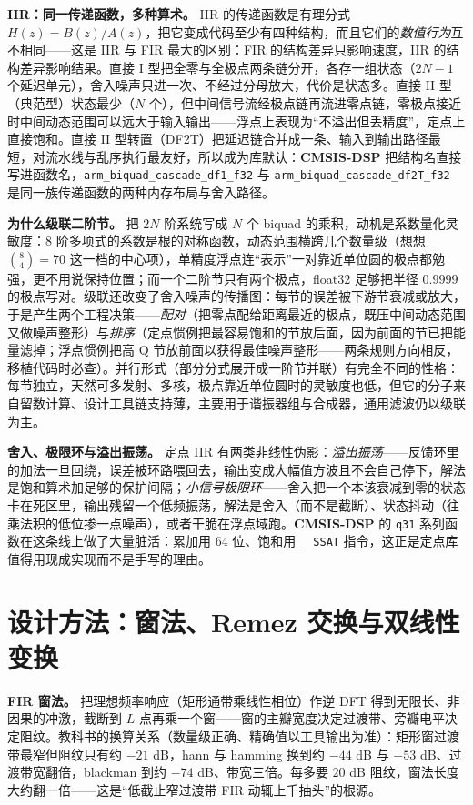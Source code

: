 \documentclass[12pt,a4paper,fontset=fandol]{ctexbook}
\newcommand{\Tp}[1]{\texttt{#1}}
\newcommand{\Bk}{\allowbreak}
\newcommand{\Lib}[1]{\textbf{#1}}
\begin{document}
\textbf{IIR：同一传递函数，多种算术。} IIR 的传递函数是有理分式 $H(z) = B(z)/A(z)$，把它变成代码至少有四种结构，而且它们的\emph{数值行为}互不相同——这是 IIR 与 FIR 最大的区别：FIR 的结构差异只影响速度，IIR 的结构差异影响结果。直接 I 型把全零与全极点两条链分开，各存一组状态（$2N-1$ 个延迟单元），舍入噪声只进一次、不经过分母放大，代价是状态多。直接 II 型（典范型）状态最少（$N$ 个），但中间信号流经极点链再流进零点链，零极点接近时中间动态范围可以远大于输入输出——浮点上表现为``不溢出但丢精度''，定点上直接饱和。直接 II 型转置（DF2T）把延迟链合并成一条、输入到输出路径最短，对流水线与乱序执行最友好，所以成为库默认：\Lib{CMSIS-DSP} 把结构名直接写进函数名，\Tp{arm\Bk\_biquad\Bk\_cascade\Bk\_df1\Bk\_f32} 与 \Tp{arm\Bk\_biquad\Bk\_cascade\Bk\_df2T\Bk\_f32} 是同一族传递函数的两种内存布局与舍入路径。

\textbf{为什么级联二阶节。} 把 $2N$ 阶系统写成 $N$ 个 biquad 的乘积，动机是系数量化灵敏度：$8$ 阶多项式的系数是根的对称函数，动态范围横跨几个数量级（想想 $\binom{8}{4} = 70$ 这一档的中心项），单精度浮点连``表示''一对靠近单位圆的极点都勉强，更不用说保持位置；而一个二阶节只有两个极点，float32 足够把半径 $0.9999$ 的极点写对。级联还改变了舍入噪声的传播图：每节的误差被下游节衰减或放大，于是产生两个工程决策——\emph{配对}（把零点配给距离最近的极点，既压中间动态范围又做噪声整形）与\emph{排序}（定点惯例把最容易饱和的节放后面，因为前面的节已把能量滤掉；浮点惯例把高 Q 节放前面以获得最佳噪声整形——两条规则方向相反，移植代码时必查）。并行形式（部分分式展开成一阶节并联）有完全不同的性格：每节独立，天然可多发射、多核，极点靠近单位圆时的灵敏度也低，但它的分子来自留数计算、设计工具链支持薄，主要用于谐振器组与合成器，通用滤波仍以级联为主。

\textbf{舍入、极限环与溢出振荡。} 定点 IIR 有两类非线性伪影：\emph{溢出振荡}——反馈环里的加法一旦回绕，误差被环路喂回去，输出变成大幅值方波且不会自己停下，解法是饱和算术加足够的保护间隔；\emph{小信号极限环}——舍入把一个本该衰减到零的状态卡在死区里，输出残留一个低频振荡，解法是舍入（而不是截断）、状态抖动（往乘法积的低位掺一点噪声），或者干脆在浮点域跑。\Lib{CMSIS-DSP} 的 \Tp{q31} 系列函数在这条线上做了大量脏活：累加用 64 位、饱和用 \Tp{\_\_SSAT} 指令，这正是定点库值得用现成实现而不是手写的理由。

\section{设计方法：窗法、Remez 交换与双线性变换}

\textbf{FIR 窗法。} 把理想频率响应（矩形通带乘线性相位）作逆 DFT 得到无限长、非因果的冲激，截断到 $L$ 点再乘一个窗——窗的主瓣宽度决定过渡带、旁瓣电平决定阻纹。教科书的换算关系（数量级正确、精确值以工具输出为准）：矩形窗过渡带最窄但阻纹只有约 $-21$ dB，hann 与 hamming 换到约 $-44$ dB 与 $-53$ dB、过渡带宽翻倍，blackman 到约 $-74$ dB、带宽三倍。每多要 $20$ dB 阻纹，窗法长度大约翻一倍——这是``低截止窄过渡带 FIR 动辄上千抽头''的根源。
\end{document}
